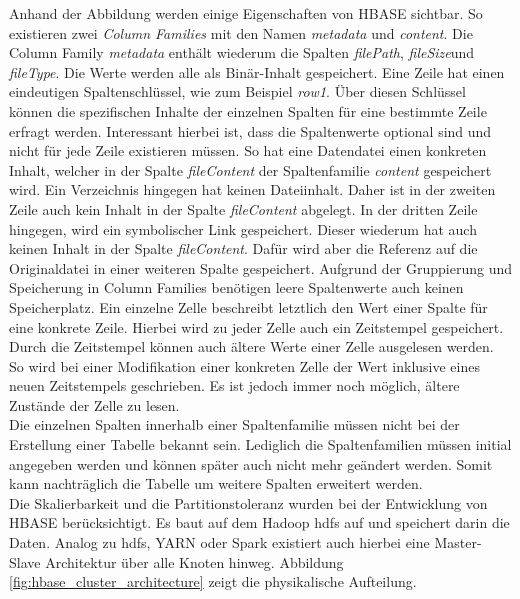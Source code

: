\noindent
Anhand der Abbildung werden einige Eigenschaften von HBASE sichtbar. So existieren zwei \textit{Column Families} mit den Namen \textit{metadata} und \textit{content}. Die Column Family \textit{metadata} enthält wiederum die Spalten \textit{filePath}, \textit{fileSize}und \textit{fileType}. Die Werte werden alle als Binär-Inhalt gespeichert. Eine Zeile hat einen eindeutigen Spaltenschlüssel, wie zum Beispiel \textit{row1}. 
Über diesen Schlüssel können die spezifischen Inhalte der einzelnen Spalten für eine bestimmte Zeile erfragt werden. Interessant hierbei ist, dass die Spaltenwerte optional sind und nicht für jede Zeile existieren müssen. So hat eine Datendatei einen konkreten Inhalt, welcher in der Spalte \textit{fileContent} der Spaltenfamilie \textit{content} gespeichert wird. Ein Verzeichnis hingegen hat keinen Dateiinhalt. 
Daher ist in der zweiten Zeile auch kein Inhalt in der Spalte \textit{fileContent} abgelegt. In der dritten Zeile hingegen, wird ein symbolischer Link gespeichert. Dieser wiederum hat auch keinen Inhalt in der Spalte \textit{fileContent}. Dafür wird aber die Referenz auf die Originaldatei in einer weiteren Spalte gespeichert. Aufgrund der Gruppierung und Speicherung in Column Families benötigen leere Spaltenwerte auch keinen Speicherplatz. 
Ein einzelne Zelle beschreibt letztlich den Wert einer Spalte für eine konkrete Zeile. Hierbei wird zu jeder Zelle auch ein Zeitstempel gespeichert. Durch die Zeitstempel können auch ältere Werte einer Zelle ausgelesen werden. 
So wird bei einer Modifikation einer konkreten Zelle der Wert inklusive eines neuen Zeitstempels geschrieben. Es ist jedoch immer noch möglich, ältere Zustände der Zelle zu lesen.\\
Die einzelnen Spalten innerhalb einer Spaltenfamilie müssen nicht bei der Erstellung einer Tabelle bekannt sein. Lediglich die Spaltenfamilien müssen initial angegeben werden und können später auch nicht mehr geändert werden. Somit kann nachträglich die Tabelle um weitere Spalten erweitert werden.\cite[S. 577]{hadoop_definitive_guide}\\

\noindent
Die Skalierbarkeit und die Partitionstoleranz wurden bei der Entwicklung von HBASE berücksichtigt. Es baut auf dem Hadoop \gls{hdfs} auf und speichert darin die Daten. Analog zu \gls{hdfs}, YARN oder Spark existiert auch hierbei eine Master-Slave Architektur über alle Knoten hinweg. Abbildung \ref{fig:hbase_cluster_architecture} zeigt die physikalische Aufteilung.\\

